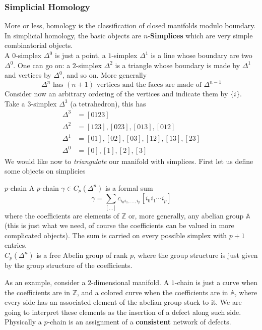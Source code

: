 \documentclass[11pt]{article}
\theoremstyle{definition}
\numberwithin{equation}{section}
\newcommand*\bbA{\mathbb{A}}
\newcommand*\bbZ{\mathbb{Z}}
\begin{document}
\subsubsection{Simplicial Homology}\label{hom}
More or less, homology is the classification of closed manifolds modulo boundary. In simplicial homology, the basic objects are $n$-\textbf{Simplices}  which are very simple combinatorial objects.\\
A $0$-simplex $\Delta^{0}$ is just a point, a $1$-simplex $\Delta^{1}$ is a line whose boundary are two $\Delta^{0}$. One can go on: a $2$-simplex $\Delta^{2}$ is a triangle whose boundary is made by $\Delta^{1}$ and vertices by $\Delta^{0}$, and so on. More generally
\begin{equation}
	\Delta^{n}\text{ has }(n+1)\text{ vertices and the faces are made of }\Delta^{n-1}
\end{equation}
Consider now an arbitrary ordering of the vertices and indicate them by $\{i\}$. Take a $3$-simplex $\Delta^{3}$ (a tetrahedron), this has
\begin{equation}
\begin{split}
	\Delta^{3}&=[0123]\\
	\Delta^{2}&=[123],[023],[013],[012]\\
	\Delta^{1}&=[01],[02],[03],[12],[13],[23]\\
	\Delta^{0}&=[0],[1],[2],[3]
\end{split}
\end{equation}
We would like now to \textit{triangulate} our manifold with simplices. First let us define some objects on simplicies
\begin{defn}{$p$-chain}{}
	A $p$-chain $\gamma\in C_{p}(\Delta^{n})$ is a formal sum
	\begin{equation}
		\gamma=\sum_{[\ldots]}c_{i_{0}i_{1},\ldots,i_{p}}[i_{0}i_{1}\cdots i_{p}]
	\end{equation}
	where the coefficients are elements of $\bbZ$ or, more generally, any abelian group $\bbA$ (this is just what we need, of course the coefficients can be valued in more complicated objects). The sum is carried on every possible simplex with $p+1$ entries.\\
	$C_{p}(\Delta^{n})$ is a free Abelin group of rank $p$, where the group structure is just given by the group structure of the coefficients.
\end{defn}
As an example, consider a $2$-dimensional manifold. A $1$-chain is just a curve when the coefficients are in $\bbZ$, and a colored curve when the coefficients are in $\bbA$, where every side has an associated element of the abelian group stuck to it. We are going to interpret these elements as the insertion of a defect along such side. Physically a $p$-chain is an assignment of a \textbf{consistent} network of defects.\\
\end{document}
